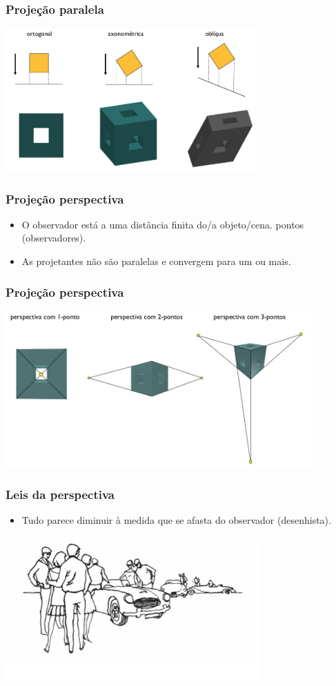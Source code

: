 \documentclass{beamer}
\begin{document}
	\begin{frame}
		\frametitle{Projeção paralela}
		\begin{center}
			\includegraphics[height=5.5cm]{ortogonal.png}
		\end{center}
	\end{frame}
	\begin{frame}
		\frametitle{Projeção perspectiva}
		\begin{itemize}
		\item O observador está a uma distância finita do/a objeto/cena. pontos (observadores).
		\item As projetantes não são paralelas e convergem para um ou mais.
		\end{itemize}
	\end{frame}
	\begin{frame}
		\frametitle{Projeção perspectiva}
		\begin{center}
			\includegraphics[height=6cm]{perspectiva.png}
		\end{center}
	\end{frame}
	\begin{frame}
		\frametitle{Leis da perspectiva}
		\begin{itemize}
		\item Tudo parece diminuir à medida que se afasta do observador (desenhista).
		\end{itemize}
		\begin{center}
			\includegraphics[height=5.5cm]{foto.jpg}
		\end{center}
	\end{frame}
\end{document}
